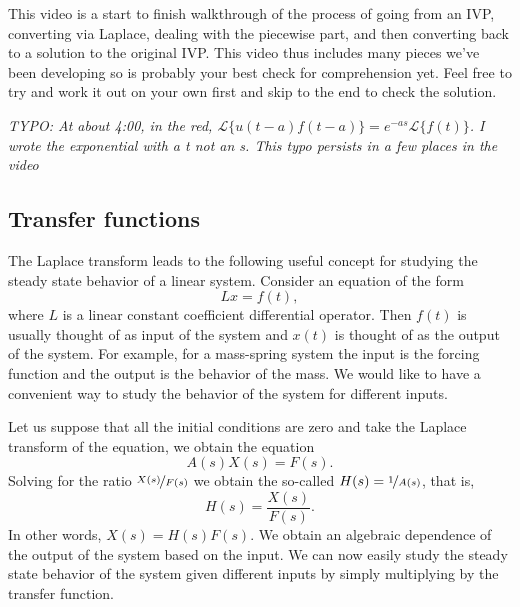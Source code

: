 \begin{video}
	This video is a start to finish walkthrough of the process of going from an IVP, converting via Laplace, dealing with the piecewise part, and then converting back to a solution to the original IVP. This video thus includes many pieces we've been developing so is probably your best check for comprehension yet. Feel free to try and work it out on your own first and skip to the end to check the solution. 

	\emph{TYPO: At about 4:00, in the red, $\mathcal{L}\{u(t-a)f(t-a)\}=e^{-as}\mathcal{L}\{f(t)\}$. I wrote the exponential with a t not an s. This typo persists in a few places in the video}
\end{video}


\subsection{Transfer functions}

The Laplace transform leads to the following useful concept for studying the
steady state behavior of a linear system.  Consider an equation of the
form
\begin{equation*}
L x = f(t) ,
\end{equation*}
where $L$ is a linear constant coefficient differential operator.
Then $f(t)$ is usually thought of as input of the system and $x(t)$ is
thought of as the output of the system.  For example, for a mass-spring
system the input is the forcing function and the output is the behavior of the
mass.  We would like to have a convenient way to study the behavior of
the system for different inputs.

Let us suppose that
all the initial conditions are zero and take the Laplace transform
of the equation, we obtain the equation
\begin{equation*}
A(s) X(s) = F(s) .
\end{equation*}
Solving for the ratio $\nicefrac{X(s)}{F(s)}$ we obtain the so-called
\emph{}
$H(s) = \nicefrac{1}{A(s)}$,
that is,
\begin{equation*}
H(s) = \frac{X(s)}{F(s)} .
\end{equation*}
In other words, $X(s) = H(s) F(s)$.  We obtain an algebraic dependence of
the output of the system based on the input.  We can now easily study the
steady state behavior of the system given different inputs by simply
multiplying by the transfer function.

